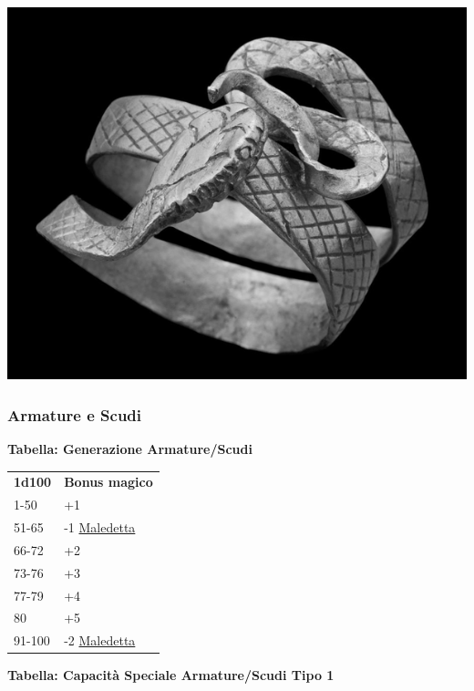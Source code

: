 \begin{multicols}{2}
{\begin{center}
\includegraphics[width=0.8\linewidth]{immagini/romanring.png}
\end{center}

\subsubsection{Armature e Scudi}

\textbf{Tabella: Generazione Armature/Scudi}\hypertarget{armatureescudi}{}\label{armatureescudi}

\medskip

{\small\begin{tabularx}{0.45\textwidth}{lX}
\textbf{1d100} & \textbf{Bonus magico}\\
1-50 &+1\\
51-65 & -1 \hyperlink{Armatura maledetta}{Maledetta}\\
66-72 & +2\\
73-76 & +3\\
77-79 & +4\\
80 &+5\\
91-100 &-2 \hyperlink{Armatura maledetta}{Maledetta}\\
\end{tabularx}}



\medskip

\textbf{Tabella: Capacità Speciale Armature/Scudi Tipo 1}\hypertarget{Capacità Speciale Armature / Scudi Tipo 1}{}

\medskip

}
\end{multicols}
